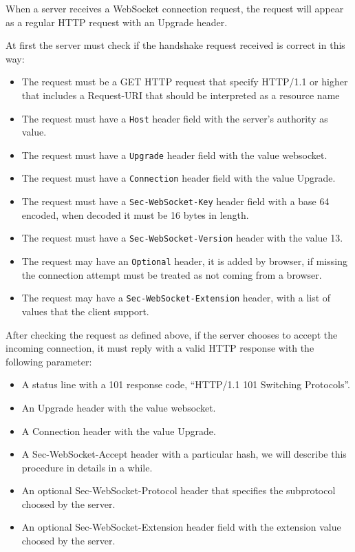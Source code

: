 When a server receives a WebSocket connection request, the request will appear as a regular HTTP request with an Upgrade header.\newline

At first the server must check if the handshake request received is correct in this way:
\begin{itemize}
	\item The request must be a GET HTTP request that specify HTTP/1.1 or higher that includes a Request-URI that should be interpreted as a resource name
	\item The request must have a \texttt{Host} header field with the server’s authority as value.
	\item The request must have a \texttt{Upgrade} header field with the value websocket.
	\item The request must have a \texttt{Connection} header field with the value Upgrade.
	\item The request must have a \texttt{Sec-WebSocket-Key} header field with a base 64 encoded, when decoded it must be 16 bytes in length.
	\item The request must have a \texttt{Sec-WebSocket-Version} header with the value 13.
	\item The request may have an \texttt{Optional} header, it is added by browser, if missing the connection attempt must be treated as not coming from a browser.
	\item The request may have a \texttt{Sec-WebSocket-Extension} header, with a list of values that the client support.
	
\end{itemize}

After checking the request as defined above, if the server chooses to accept the incoming connection, it must reply with a valid HTTP response with the following parameter:
\begin{itemize}
	\item A status line with a 101 response code, “HTTP/1.1 101 Switching Protocols”.
	\item An Upgrade header with the value websocket.
	\item A Connection header with the value Upgrade.
	\item A Sec-WebSocket-Accept header with a particular hash, we will describe this procedure in details in a while.
	\item An optional Sec-WebSocket-Protocol header that specifies the subprotocol choosed by the server.
	\item An optional Sec-WebSocket-Extension header field with the extension value choosed by the server.
\end{itemize}

